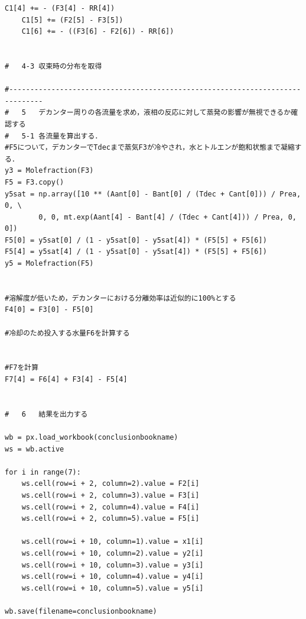 \documentclass[a4j]{jsreport}
\begin{document}
\begin{lstlisting}[caption=気液反応器の解析]
    C1[4] += - (F3[4] - RR[4])
    C1[5] += (F2[5] - F3[5])
    C1[6] += - ((F3[6] - F2[6]) - RR[6])


#   4-3 収束時の分布を取得

#------------------------------------------------------------------------------
#   5   デカンター周りの各流量を求め，液相の反応に対して蒸発の影響が無視できるか確認する
#   5-1 各流量を算出する．
#F5について，デカンターでTdecまで蒸気F3が冷やされ，水とトルエンが飽和状態まで凝縮する．
y3 = Molefraction(F3)
F5 = F3.copy()
y5sat = np.array([10 ** (Aant[0] - Bant[0] / (Tdec + Cant[0])) / Prea, 0, \
        0, 0, mt.exp(Aant[4] - Bant[4] / (Tdec + Cant[4])) / Prea, 0, 0])
F5[0] = y5sat[0] / (1 - y5sat[0] - y5sat[4]) * (F5[5] + F5[6])
F5[4] = y5sat[4] / (1 - y5sat[0] - y5sat[4]) * (F5[5] + F5[6])
y5 = Molefraction(F5)


#溶解度が低いため，デカンターにおける分離効率は近似的に100%とする
F4[0] = F3[0] - F5[0]

#冷却のため投入する水量F6を計算する


#F7を計算
F7[4] = F6[4] + F3[4] - F5[4]


#   6   結果を出力する

wb = px.load_workbook(conclusionbookname)
ws = wb.active

for i in range(7):
    ws.cell(row=i + 2, column=2).value = F2[i]
    ws.cell(row=i + 2, column=3).value = F3[i]
    ws.cell(row=i + 2, column=4).value = F4[i]
    ws.cell(row=i + 2, column=5).value = F5[i]

    ws.cell(row=i + 10, column=1).value = x1[i]
    ws.cell(row=i + 10, column=2).value = y2[i]
    ws.cell(row=i + 10, column=3).value = y3[i]
    ws.cell(row=i + 10, column=4).value = y4[i]
    ws.cell(row=i + 10, column=5).value = y5[i]

wb.save(filename=conclusionbookname)
\end{lstlisting}
\end{document}
